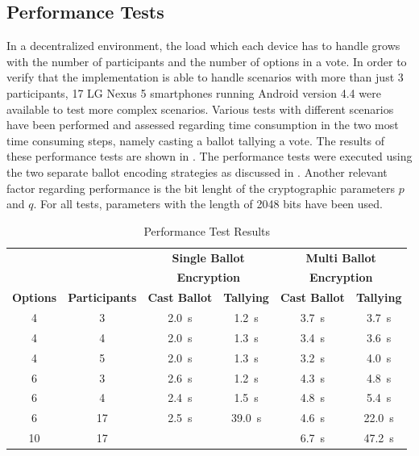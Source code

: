 \documentclass[numbers=noenddot, abstract=on, a4paper, headsepline,
footsepline, oneside, draft=off]{scrreprt}
\begin{document}
\subsection{Performance Tests}
\label{sec:performancetests}
In a decentralized environment, the load which each device has to handle grows
with the number of participants and the number of options in a vote. In order to
verify that the implementation is able to handle scenarios with more than just
3 participants, 17 LG Nexus 5 smartphones running Android version 4.4 were
available to test more complex scenarios. Various tests with different scenarios
have been performed and assessed regarding time consumption in the two most time
consuming steps, namely casting a ballot tallying a vote. The results of these
performance tests are shown in . The performance tests
were executed using the two separate ballot encoding strategies as discussed in
. Another relevant factor regarding performance is the
bit lenght of the cryptographic parameters $p$ and $q$. For all tests,
parameters with the length of 2048 bits have been used.

\begin{table}[htbp]
	\centering
	\renewcommand{\arraystretch}{1.4}
	\begin{minipage}{\linewidth}
	\begin{tabularx}{\textwidth}{cccccc}
		\toprule
		& & \multicolumn{2}{c}{\textbf{Single Ballot}} &
		\multicolumn{2}{c}{\textbf{Multi Ballot}} \\
		& & \multicolumn{2}{c}{\textbf{Encryption}} &
		\multicolumn{2}{c}{\textbf{Encryption}} \\
		\textbf{Options}	&  \textbf{Participants} & \textbf{Cast Ballot} &
		\textbf{Tallying} & \textbf{Cast Ballot} &	\textbf{Tallying}
		\\
		\midrule
		4 & 3 & \SI{2.0}{\second} & \SI{1.2}{\second} & \SI{3.7}{\second} & 
		\SI{3.7}{\second} \\
		4 & 4 & \SI{2.0}{\second} & \SI{1.3}{\second} & \SI{3.4}{\second} &	
		\SI{3.6}{\second} \\
		4 & 5 & \SI{2.0}{\second} & \SI{1.3}{\second} & \SI{3.2}{\second} & 
		\SI{4.0}{\second} \\
		6 & 3 & \SI{2.6}{\second} & \SI{1.2}{\second} & \SI{4.3}{\second} &	
		\SI{4.8}{\second} \\
		6 & 4 & \SI{2.4}{\second} & \SI{1.5}{\second} & \SI{4.8}{\second} &	
		\SI{5.4}{\second} \\
		6 & 17 & \SI{2.5}{\second} & \SI{39.0}{\second} & \SI{4.6}{\second} & 
		\SI{22.0}{\second} \\
		10 & 17 &  &  & \SI{6.7}{\second} &	
		\SI{47.2}{\second} \\
		\bottomrule
	\end{tabularx}
	\end{minipage}
	\renewcommand{\arraystretch}{1}
	\caption{Performance Test Results}
	\label{tab:perftestresults}
\end{table}
\end{document}
